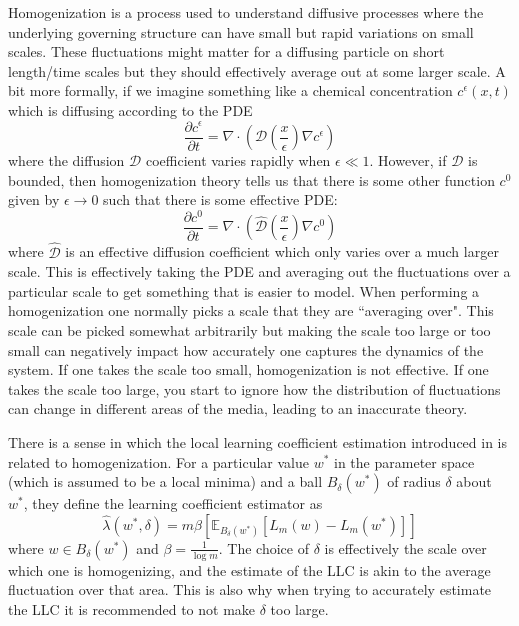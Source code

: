 \documentclass{article} %
\theoremstyle{definition}
\begin{document}
Homogenization is a process used to understand diffusive processes where the underlying governing structure can have small but rapid variations on small scales. These fluctuations might matter for a diffusing particle on short length/time scales but they should effectively average out at some larger scale. A bit more formally, if we imagine something like a chemical concentration $c^\epsilon(x,t)$ which is diffusing according to the PDE
\begin{equation}
    \frac{\partial c^\epsilon}{\partial t} = \nabla \cdot (\mathcal{D}(\frac{x}{\epsilon}) \nabla c^\epsilon)
\end{equation}
where the diffusion $\mathcal{D}$ coefficient varies rapidly when $\epsilon \ll 1$. However, if $\mathcal{D}$ is bounded, then homogenization theory tells us that there is some other function $c^0$ given by $\epsilon \to 0$ such that there is some effective PDE:
\begin{equation}
        \frac{\partial c^0}{\partial t} = \nabla \cdot (\hat{\mathcal{D}}(\frac{x}{\epsilon}) \nabla c^0)
\end{equation}
where $\hat{\mathcal{D}}$ is an effective diffusion coefficient which only varies over a much larger scale. This is effectively taking the PDE and averaging out the fluctuations over a particular scale to get something that is easier to model. When performing a homogenization one normally picks a scale that they are ``averaging over". This scale can be picked somewhat arbitrarily but making the scale too large or too small can negatively impact how accurately one captures the dynamics of the system. If one takes the scale too small, homogenization is not effective. If one takes the scale too large, you start to ignore how the distribution of fluctuations can change in different areas of the media, leading to an inaccurate theory.

There is a sense in which the local learning coefficient estimation introduced in \citep{lau2024locallearningcoefficientsingularityaware} is related to homogenization. For a particular value $w^*$ in the parameter space (which is assumed to be a local minima) and a ball $B_\delta(w^*)$ of radius $\delta$ about $w^*$, they define the learning coefficient estimator as
\begin{equation}
    \hat{\lambda}(w^*, \delta) = m \beta [\mathbb{E}_{B_\delta(w^*)}[L_m(w)-L_m(w^*)]]
\end{equation}
where $w \in B_\delta(w^*)$ and $\beta = \frac{1}{\log m}$. The choice of $\delta$ is effectively the scale over which one is homogenizing, and the estimate of the LLC is akin to the average fluctuation over that area. This is also why when trying to accurately estimate the LLC it is recommended to not make $\delta$ too large.
\end{document}
